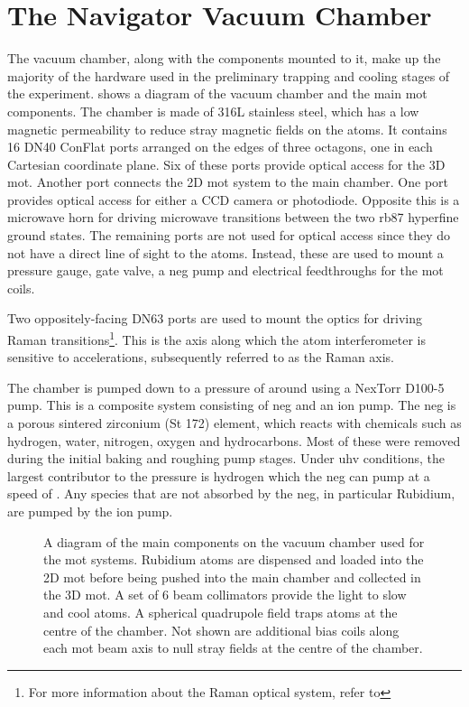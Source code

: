 \section{The Navigator Vacuum Chamber}\label{sec:vacuum_chamber}
The vacuum chamber, along with the components mounted to it, make up the
majority of the hardware used in the preliminary trapping and cooling
stages of
the experiment.  shows a diagram of the
vacuum chamber and the main \ac{mot} components. The chamber is made of 316L stainless
steel, which has a low magnetic permeability to reduce stray magnetic
fields on the atoms. It contains 16 DN40
ConFlat ports arranged
on the edges of three octagons, one in each Cartesian coordinate plane. Six of
these ports provide optical access for the 3D \ac{mot}. Another port
connects the 2D \ac{mot} system to the main chamber. One port provides
optical access for either a CCD camera or photodiode. Opposite this is
a microwave horn for driving microwave transitions between the two
\ac{rb87} hyperfine ground states. The remaining ports are not
used for optical access since
they do not have a direct line of sight to the atoms. Instead, these
are used to mount a pressure gauge, gate valve, a \ac{neg} pump
and electrical feedthroughs for the \ac{mot} coils. 
\par\noindent
Two oppositely-facing DN63
ports are used to mount the optics for driving Raman transitions\footnote{For more information about the Raman optical system,
refer to }. This is the axis along which the atom interferometer is sensitive to
accelerations, subsequently referred to as the Raman axis.
\par\noindent  The chamber is pumped down to a pressure of around
\sivalue{}{\milli\bar} using a NexTorr D100-5 pump. This is a
composite system consisting of \ac{neg} and an ion pump. The \ac{neg} is a
porous sintered zirconium (St 172) element, which reacts with chemicals such as
hydrogen, water, nitrogen, oxygen and hydrocarbons. Most of these were removed
during the initial baking and roughing pump stages. Under \ac{uhv} conditions,
the largest contributor to the pressure is hydrogen which the \ac{neg} can pump
at a speed of . Any species that are not
absorbed by the \ac{neg}, in particular Rubidium, are pumped by the
 ion pump.
\begin{figure}[!htbp]
	\centering
	\def\svgwidth{1\textwidth}
	
	\caption[\ac{mot} system component diagram]{A diagram of the main components on the vacuum chamber used for the \ac{mot}
		systems. Rubidium atoms are dispensed and loaded into the 2D \ac{mot}
		before being pushed into the main chamber and collected in the 3D
		\ac{mot}. A set of 6 beam collimators provide the light to
		slow and cool atoms.  A spherical quadrupole
		field traps atoms at the centre of the chamber. Not shown are additional bias
		coils along each \ac{mot} beam axis to null stray fields at the centre
		of the chamber.}
	\label{fig:mot_system}
\end{figure}
